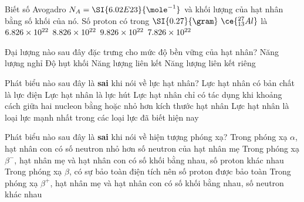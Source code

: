 \begin{ex}
	Biết số Avogadro $N_A=\SI{6.02E23}{\mole^{-1}}$ và khối lượng của hạt nhân bằng số khối của nó. Số proton có trong $\SI{0.27}{\gram}\ \ce{^{27}_{13}Al}$ là
	\choice
	{$\SI{6.826E22}{}$}
	{$\SI{8.826E22}{}$}
	{$\SI{9.826E22}{}$}
	{\True $\SI{7.826E22}{}$}
	\loigiai{}
\end{ex}
\begin{ex}
	Đại lượng nào sau đây đặc trưng cho mức độ bền vững của hạt nhân?
	\choice
	{Năng lượng nghỉ}
	{Độ hụt khối}
	{Năng lượng liên kết}
	{\True Năng lượng liên kết riêng}
	\loigiai{}
\end{ex}
\begin{ex}
Phát biểu nào sau đây là \textbf{sai} khi nói về lực hạt nhân?	
	\choice
	{\True Lực hạt nhân có bản chất là lực điện}
	{Lực hạt nhân là lực hút}
	{Lực hạt nhân chỉ có tác dụng khi khoảng cách giữa hai nucleon bằng hoặc nhỏ hơn kích thước hạt nhân}
	{Lực hạt nhân là loại lực mạnh nhất trong các loại lực đã biết hiện nay}
	\loigiai{}
\end{ex}
\begin{ex}
	Phát biểu nào sau đây là \textbf{sai} khi nói về hiện tượng phóng xạ?
	\choice
	{Trong phóng xạ $\alpha$, hạt nhân con có số neutron nhỏ hơn số neutron của hạt nhân mẹ}
	{Trong phóng xạ $\beta^{-}$, hạt nhân mẹ và hạt nhân con có số khối bằng nhau, số proton khác nhau}
	{\True Trong phóng xạ $\beta$, có sự bảo toàn điện tích nên số proton được bảo toàn}
	{Trong phóng xạ $\beta^+$, hạt nhân mẹ và hạt nhân con có số khối bằng nhau, số neutron khác nhau}
	\loigiai{}
\end{ex}
